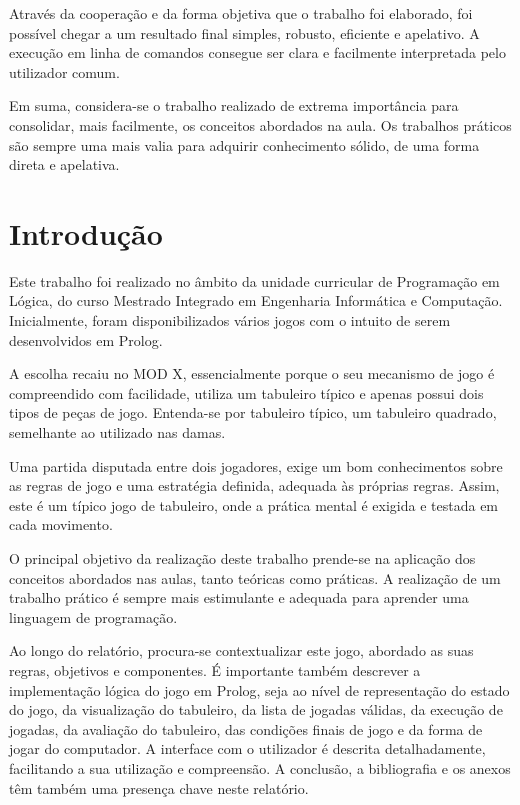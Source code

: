 \documentclass[a4paper]{article}
\begin{document}
Através da cooperação e da forma objetiva que o trabalho foi elaborado, foi possível chegar a um resultado final simples, robusto, eficiente e apelativo. A execução em linha de comandos consegue ser clara e facilmente interpretada pelo utilizador comum. 

Em suma, considera-se o trabalho realizado de extrema importância para consolidar, mais facilmente, os conceitos abordados na aula. Os trabalhos práticos são sempre uma mais valia para adquirir conhecimento sólido, de uma forma direta e apelativa. 

\newpage


\tableofcontents

\newpage


\section{Introdução\newline}

Este trabalho foi realizado no âmbito da unidade curricular de Programação em Lógica, do curso Mestrado Integrado em Engenharia Informática e Computação. Inicialmente, foram disponibilizados vários jogos com o intuito de serem desenvolvidos em Prolog. 

A escolha recaiu no MOD X, essencialmente porque o seu mecanismo de jogo é compreendido com facilidade, utiliza um tabuleiro típico e apenas possui dois tipos de peças de jogo. Entenda-se por tabuleiro típico, um tabuleiro quadrado, semelhante ao utilizado nas damas.

Uma partida disputada entre dois jogadores, exige um bom conhecimentos sobre as regras de jogo e uma estratégia definida, adequada às próprias regras. Assim, este é um típico jogo de tabuleiro, onde a prática mental é exigida e testada em cada movimento.

O principal objetivo da realização deste trabalho prende-se na aplicação dos conceitos abordados nas aulas, tanto teóricas como práticas. A realização de um trabalho prático é sempre mais estimulante e adequada para aprender uma linguagem de programação.

Ao longo do relatório, procura-se contextualizar este jogo, abordado as suas regras, objetivos e componentes. É importante também descrever a implementação lógica do jogo em Prolog, seja ao nível de representação do estado do jogo, da visualização do tabuleiro, da lista de jogadas válidas, da execução de jogadas, da avaliação do tabuleiro, das condições finais de jogo e da forma de jogar do computador. A interface com o utilizador é descrita detalhadamente, facilitando a sua utilização e compreensão. A conclusão, a bibliografia e os anexos têm também uma presença chave neste relatório. 
\end{document}
